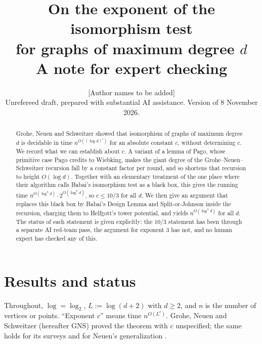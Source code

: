 \documentclass[11pt]{article}
\title{On the exponent of the isomorphism test\\ for graphs of maximum degree $d$\\[4pt]
\large A note for expert checking}
\author{[Author names to be added]\\[2pt]
\small Unrefereed draft, prepared with substantial AI assistance. Version of 8 November 2026.}
\date{}
\theoremstyle{definition}
\theoremstyle{remark}
\begin{document}
\maketitle

\begin{abstract}
Grohe, Neuen and Schweitzer showed that isomorphism of graphs of maximum degree $d$ is decidable in time $n^{O((\log d)^c)}$ for an absolute constant $c$, without determining $c$. We record what we can establish about $c$. A variant of a lemma of Pago, whose primitive case Pago credits to Wiebking, makes the giant degree of the Grohe--Neuen--Schweitzer recursion fall by a constant factor per round, and so shortens that recursion to height $O(\log d)$. Together with an elementary treatment of the one place where their algorithm calls Babai's isomorphism test as a black box, this gives the running time $n^{O(\log^3 d)}\cdot 2^{O(\log^5 d)}$, so $c\le 10/3$ for all $d$. We then give an argument that replaces this black box by Babai's Design Lemma and Split-or-Johnson inside the recursion, charging them to Helfgott's tower potential, and yields $n^{O(\log^3 d)}$ for all $d$. The status of each statement is given explicitly: the $10/3$ statement has been through a separate AI red-team pass, the argument for exponent $3$ has not, and no human expert has checked any of this.
\end{abstract}

\tableofcontents

\section{Results and status}

Throughout, $\log=\log_2$, $L:=\log(d+2)$ with $d\ge2$, and $n$ is the number of vertices or points. ``Exponent $c$'' means time $n^{O(L^c)}$. Grohe, Neuen and Schweitzer \cite{GNS} (hereafter GNS) proved the theorem with $c$ unspecified; the same holds for its surveys \cite{GN21,Neu26} and for Neuen's generalization \cite{Neu20}.
\end{document}
